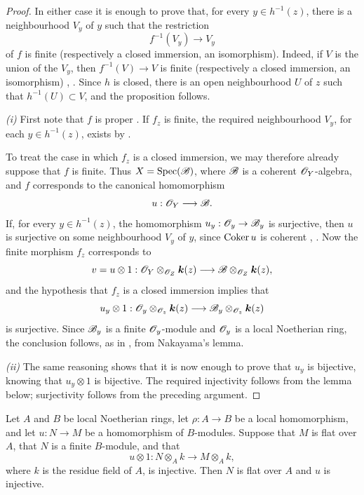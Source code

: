 \begin{proof}
In either case it is enough to prove that, for every
$y\in h^{-1}(z)$, there is a neighbourhood $V_y$ of $y$ such that
the restriction
\[
  f^{-1}(V_y)\longrightarrow V_y
\]
of $f$ is finite (respectively a closed immersion, an isomorphism).
Indeed, if $V$ is the union of the $V_y$, then
$f^{-1}(V)\to V$ is finite (respectively a closed immersion, an
isomorphism) , .  Since $h$ is
closed, there is an open neighbourhood $U$ of $z$ such that
$h^{-1}(U)\subset V$, and the proposition follows.

\noindent\textit{(i)} First note that $f$ is proper
.  If
$f_z$ is finite, the required neighbourhood $V_y$, for each
$y\in h^{-1}(z)$, exists by .


To treat the case in which $f_z$ is a closed immersion, we may
therefore already suppose that $f$ is finite.  Thus
$X=\operatorname{Spec}(\mathscr{B})$, where $\mathscr{B}$ is a coherent
$\mathscr{O}_Y$-algebra, and $f$ corresponds  to the
canonical homomorphism
\[
  u:\mathscr{O}_Y\longrightarrow\mathscr{B}.
\]
If, for every $y\in h^{-1}(z)$, the homomorphism
$u_y:\mathscr{O}_y\to\mathscr{B}_y$ is surjective, then $u$ is surjective on
some neighbourhood $V_y$ of $y$, since $\operatorname{Coker} u$ is coherent
, .  Now the finite morphism
$f_z$ corresponds to
\[
  v=u\otimes1:
  \mathscr{O}_Y\otimes_{\mathscr{O}_Z}\boldsymbol{k}(z)
  \longrightarrow
  \mathscr{B}\otimes_{\mathscr{O}_Z}\boldsymbol{k}(z),
\]
and the hypothesis that $f_z$ is a closed immersion implies that
\[
  u_y\otimes1:
  \mathscr{O}_y\otimes_{\mathscr{O}_z}\boldsymbol{k}(z)
  \longrightarrow
  \mathscr{B}_y\otimes_{\mathscr{O}_z}\boldsymbol{k}(z)
\]
is surjective.  Since $\mathscr{B}_y$ is a finite $\mathscr{O}_y$-module and
$\mathscr{O}_y$ is a local Noetherian ring, the conclusion follows, as
in , from Nakayama's lemma.

\noindent\textit{(ii)} The same reasoning shows that it is now
enough to prove
that $u_y$ is bijective, knowing that $u_y\otimes1$ is bijective.
The required injectivity follows from the lemma below; surjectivity
follows from the preceding argument.
\end{proof}

\begin{lemma}[4.6.7.1]
\label{III.4.6.7.1}
Let $A$ and $B$ be local Noetherian rings, let
$\rho:A\to B$ be a local homomorphism, and let $u:N\to M$ be a
homomorphism of $B$-modules.  Suppose that $M$ is flat over $A$,
that $N$ is a finite $B$-module, and that
\[
  u\otimes1:
  N\otimes_A k\longrightarrow M\otimes_A k,
\]
where $k$ is the residue field of $A$, is injective.  Then $N$ is
flat over $A$ and $u$ is injective.
\end{lemma}

